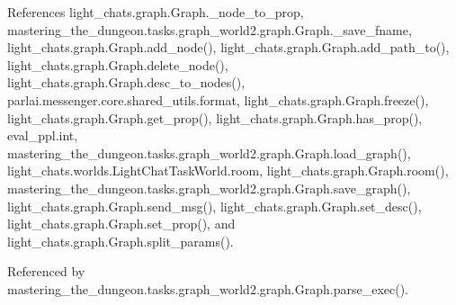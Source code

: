 References light\+\_\+chats.\+graph.\+Graph.\+\_\+node\+\_\+to\+\_\+prop, mastering\+\_\+the\+\_\+dungeon.\+tasks.\+graph\+\_\+world2.\+graph.\+Graph.\+\_\+save\+\_\+fname, light\+\_\+chats.\+graph.\+Graph.\+add\+\_\+node(), light\+\_\+chats.\+graph.\+Graph.\+add\+\_\+path\+\_\+to(), light\+\_\+chats.\+graph.\+Graph.\+delete\+\_\+node(), light\+\_\+chats.\+graph.\+Graph.\+desc\+\_\+to\+\_\+nodes(), parlai.\+messenger.\+core.\+shared\+\_\+utils.\+format, light\+\_\+chats.\+graph.\+Graph.\+freeze(), light\+\_\+chats.\+graph.\+Graph.\+get\+\_\+prop(), light\+\_\+chats.\+graph.\+Graph.\+has\+\_\+prop(), eval\+\_\+ppl.\+int, mastering\+\_\+the\+\_\+dungeon.\+tasks.\+graph\+\_\+world2.\+graph.\+Graph.\+load\+\_\+graph(), light\+\_\+chats.\+worlds.\+Light\+Chat\+Task\+World.\+room, light\+\_\+chats.\+graph.\+Graph.\+room(), mastering\+\_\+the\+\_\+dungeon.\+tasks.\+graph\+\_\+world2.\+graph.\+Graph.\+save\+\_\+graph(), light\+\_\+chats.\+graph.\+Graph.\+send\+\_\+msg(), light\+\_\+chats.\+graph.\+Graph.\+set\+\_\+desc(), light\+\_\+chats.\+graph.\+Graph.\+set\+\_\+prop(), and light\+\_\+chats.\+graph.\+Graph.\+split\+\_\+params().



Referenced by mastering\+\_\+the\+\_\+dungeon.\+tasks.\+graph\+\_\+world2.\+graph.\+Graph.\+parse\+\_\+exec().

